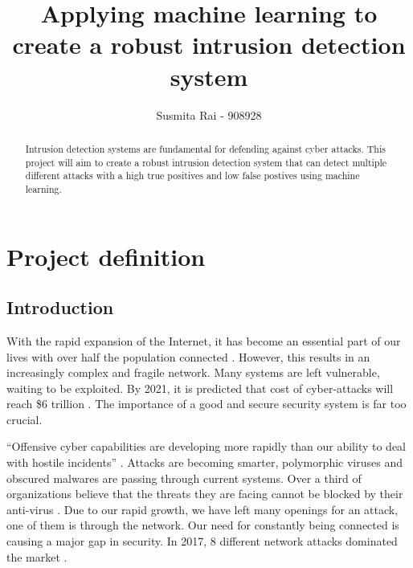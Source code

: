 \documentclass[11pt]{article}
\begin{document}
\title{Applying machine learning to create a robust intrusion detection system}
\author{Susmita Rai - 908928}
\date{}
\maketitle
\begin{abstract}
Intrusion detection systems are fundamental for defending against cyber attacks. This project will aim to create a robust intrusion detection system that can detect multiple different attacks with a high true positives and low false postives using machine learning.
\end{abstract}

\newpage

\tableofcontents
\newpage

\setlength{\parskip}{0.5em}

\section{Project definition}
\subsection{Introduction}
With the rapid expansion of the Internet, it has become an essential part of our lives with over half the population connected \cite{wearesocial}. However, this results in an increasingly complex and fragile network. Many systems are left vulnerable, waiting to be exploited. By 2021, it is predicted that cost of cyber-attacks will reach \$6 trillion \cite{varonis}. The importance of a good and secure security system is far too crucial.

“Offensive cyber capabilities are developing more rapidly than our ability to deal with hostile incidents” \cite{globalrisks}. Attacks are becoming smarter, polymorphic viruses and obscured malwares are passing through current systems. Over a third of organizations believe that the threats they are facing cannot be blocked by their anti-virus \cite{varonis}. 
Due to our rapid growth, we have left many openings for an attack, one of them is through the network. Our need for constantly being connected is causing a major gap in security. In 2017, 8 different network attacks dominated the market \cite{network-attack-types}.
\end{document}
